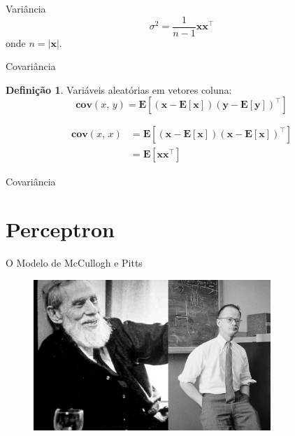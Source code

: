 \documentclass{beamer}
\theoremstyle{definition}
\newtheorem{defn}{Definição}[section]
\newcommand{\exptd}[1]{\mathbf{E}\left[#1\right]}
\newcommand{\vt}[1]{\boldsymbol{#1}}
\newcommand{\trans}[1]{{#1}^\intercal}
\newcommand{\norm}[1]{\lvert#1\rvert}
\newcommand{\cov}[2]{\textbf{cov}\left(#1,\, #2\right)}
\begin{document}
\begin{frame}{Variância}
  \[ \sigma^2 = \frac{1}{n-1} \vt{x} \trans{\vt{x}} \]
  onde $n = \norm{\vt{x}}$.
\end{frame}

\begin{frame}{Covariância}
  \begin{defn}{Variáveis aleatórias em vetores coluna:}
    \[ \cov{x}{y} = \exptd{(\vt{x} - \exptd{\vt{x}}) \trans{(\vt{y} - \exptd{\vt{y}})}} \]

    \begin{align*}
      \cov{x}{x} &= \exptd{(\vt{x} - \exptd{\vt{x}}) \trans{(\vt{x} - \exptd{\vt{x}})}}\\
      &= \exptd{\vt{x} \trans{\vt{x}}}
    \end{align*}
  \end{defn}
\end{frame}

\begin{frame}{Covariância}

\end{frame}

\section{Perceptron}

\begin{frame}{O Modelo de McCullogh e Pitts}

  \begin{figure}[t]
    \includegraphics[width=0.8\textwidth]{warren_pitts.jpeg}
    \centering
  \end{figure}

\end{frame}
\end{document}
